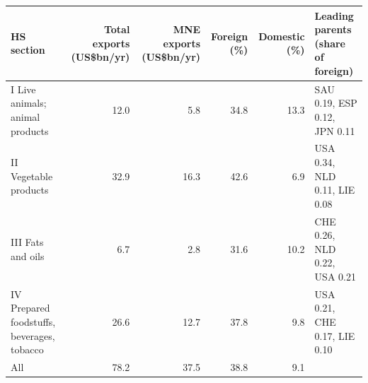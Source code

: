 \begin{tabular}{@{}l r r r r l@{}}
\toprule
HS section & Total exports (US\$bn/yr) & MNE exports (US\$bn/yr) & Foreign (\%) & Domestic (\%) & Leading parents (share of foreign) \\
\midrule
I Live animals; animal products & 12.0 & 5.8 & 34.8 & 13.3 & SAU 0.19, ESP 0.12, JPN 0.11 \\
II Vegetable products & 32.9 & 16.3 & 42.6 & 6.9 & USA 0.34, NLD 0.11, LIE 0.08 \\
III Fats and oils & 6.7 & 2.8 & 31.6 & 10.2 & CHE 0.26, NLD 0.22, USA 0.21 \\
IV Prepared foodstuffs, beverages, tobacco & 26.6 & 12.7 & 37.8 & 9.8 & USA 0.21, CHE 0.17, LIE 0.10 \\
\midrule
All & 78.2 & 37.5 & 38.8 & 9.1 & \\
\bottomrule
\end{tabular}

